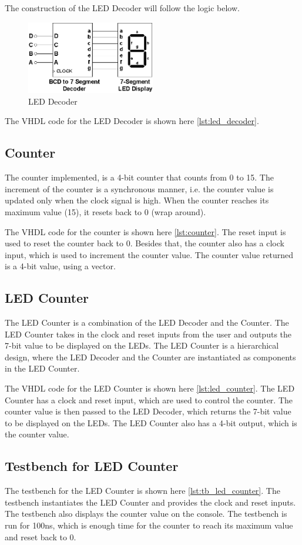 The construction of the LED Decoder will follow the logic below.

\begin{figure}[H]
    \centering
    \includegraphics[width=0.5\textwidth]{images/bcd_decoder.png}
    \caption{LED Decoder}
    \label{fig:led_decoder}
\end{figure}

The VHDL code for the LED Decoder is shown here \cref{lst:led_decoder}.

\subsection{Counter}

The counter implemented, is a 4-bit counter that counts from 0 to 15. The increment of the counter is a synchronous
manner, i.e. the counter value is updated only when the clock signal is high. When the counter reaches its maximum value
(15), it resets back to 0 (wrap around). 

The VHDL code for the counter is shown here \cref{lst:counter}. The reset input is used to reset the counter back to 0. 
Besides that, the counter also has a clock input, which is used to increment the counter value. The counter value returned
is a 4-bit value, using a vector.

\subsection{LED Counter}

The LED Counter is a combination of the LED Decoder and the Counter. The LED Counter takes in the clock and reset inputs
from the user and outputs the 7-bit value to be displayed on the LEDs. The LED Counter is a hierarchical design, where
the LED Decoder and the Counter are instantiated as components in the LED Counter.

The VHDL code for the LED Counter is shown here \cref{lst:led_counter}. The LED Counter has a clock and reset input,
which are used to control the counter. The counter value is then passed to the LED Decoder, which returns the 7-bit value
to be displayed on the LEDs. The LED Counter also has a 4-bit output, which is the counter value. 

\subsection{Testbench for LED Counter}

The testbench for the LED Counter is shown here \cref{lst:tb_led_counter}. The testbench instantiates the LED Counter
and provides the clock and reset inputs. The testbench also displays the counter value on the console. The testbench is
run for 100ns, which is enough time for the counter to reach its maximum value and reset back to 0.